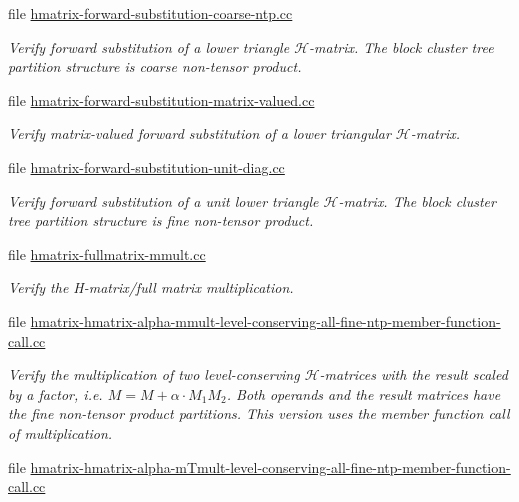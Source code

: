 \begin{DoxyCompactItemize}
file \hyperlink{hmatrix-forward-substitution-coarse-ntp_8cc}{hmatrix-\/forward-\/substitution-\/coarse-\/ntp.\+cc}
\begin{DoxyCompactList}\small\item\em Verify forward substitution of a lower triangle $\mathcal{H}$-\/matrix. The block cluster tree partition structure is coarse non-\/tensor product. \end{DoxyCompactList}\item 
file \hyperlink{hmatrix-forward-substitution-matrix-valued_8cc}{hmatrix-\/forward-\/substitution-\/matrix-\/valued.\+cc}
\begin{DoxyCompactList}\small\item\em Verify matrix-\/valued forward substitution of a lower triangular $\mathcal{H}$-\/matrix. \end{DoxyCompactList}\item 
file \hyperlink{hmatrix-forward-substitution-unit-diag_8cc}{hmatrix-\/forward-\/substitution-\/unit-\/diag.\+cc}
\begin{DoxyCompactList}\small\item\em Verify forward substitution of a unit lower triangle $\mathcal{H}$-\/matrix. The block cluster tree partition structure is fine non-\/tensor product. \end{DoxyCompactList}\item 
file \hyperlink{hmatrix-fullmatrix-mmult_8cc}{hmatrix-\/fullmatrix-\/mmult.\+cc}
\begin{DoxyCompactList}\small\item\em Verify the H-\/matrix/full matrix multiplication. \end{DoxyCompactList}\item 
file \hyperlink{hmatrix-hmatrix-alpha-mmult-level-conserving-all-fine-ntp-member-function-call_8cc}{hmatrix-\/hmatrix-\/alpha-\/mmult-\/level-\/conserving-\/all-\/fine-\/ntp-\/member-\/function-\/call.\+cc}
\begin{DoxyCompactList}\small\item\em Verify the multiplication of two level-\/conserving $\mathcal{H}$-\/matrices with the result scaled by a factor, i.\+e. $M = M + \alpha \cdot M_1 M_2$. Both operands and the result matrices have the fine non-\/tensor product partitions. This version uses the member function call of multiplication. \end{DoxyCompactList}\item 
file \hyperlink{hmatrix-hmatrix-alpha-mTmult-level-conserving-all-fine-ntp-member-function-call_8cc}{hmatrix-\/hmatrix-\/alpha-\/m\+Tmult-\/level-\/conserving-\/all-\/fine-\/ntp-\/member-\/function-\/call.\+cc}

\end{DoxyCompactItemize}
